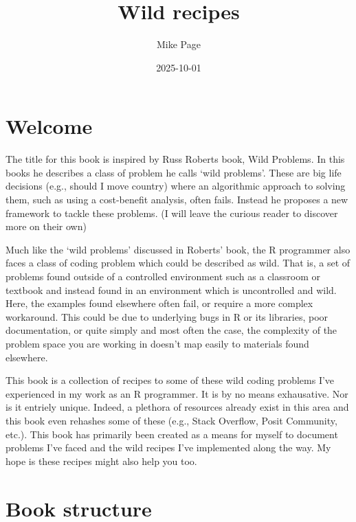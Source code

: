 \documentclass[
  letterpaper,
  DIV=11,
  numbers=noendperiod]{scrreprt}
\title{Wild recipes}
\author{Mike Page}
\date{2025-10-01}
\renewcommand*\contentsname{Table of contents}
\newcommand\contentsname{Table of contents}
\begin{document}
\maketitle

\renewcommand*\contentsname{Table of contents}
{
\hypersetup{linkcolor=}
\setcounter{tocdepth}{2}
\tableofcontents
}

\chapter*{Welcome}\label{welcome}


The title for this book is inspired by Russ Roberts book, Wild Problems.
In this books he describes a class of problem he calls `wild problems'.
These are big life decisions (e.g., should I move country) where an
algorithmic approach to solving them, such as using a cost-benefit
analysis, often fails. Instead he proposes a new framework to tackle
these problems. (I will leave the curious reader to discover more on
their own)

Much like the `wild problems' discussed in Roberts' book, the R
programmer also faces a class of coding problem which could be described
as wild. That is, a set of problems found outside of a controlled
environment such as a classroom or textbook and instead found in an
environment which is uncontrolled and wild. Here, the examples found
elsewhere often fail, or require a more complex workaround. This could
be due to underlying bugs in R or its libraries, poor documentation, or
quite simply and most often the case, the complexity of the problem
space you are working in doesn't map easily to materials found
elsewhere.

This book is a collection of recipes to some of these wild coding
problems I've experienced in my work as an R programmer. It is by no
means exhausative. Nor is it entriely unique. Indeed, a plethora of
resources already exist in this area and this book even rehashes some of
these (e.g., Stack Overflow, Posit Community, etc.). This book has
primarily been created as a means for myself to document problems I've
faced and the wild recipes I've implemented along the way. My hope is
these recipes might also help you too.


\chapter*{Book structure}\label{book-structure}
\end{document}
